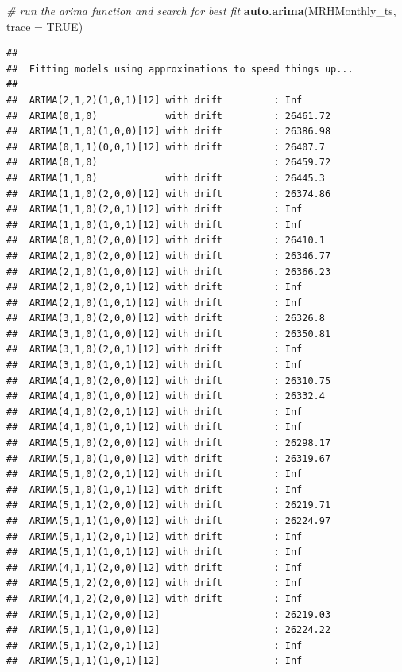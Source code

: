 \documentclass[12pt,]{article}
\newenvironment{Shaded}{\begin{snugshade}}{\end{snugshade}}
\newcommand{\CommentTok}[1]{\textcolor[rgb]{0.56,0.35,0.01}{\textit{#1}}}
\newcommand{\DataTypeTok}[1]{\textcolor[rgb]{0.13,0.29,0.53}{#1}}
\newcommand{\KeywordTok}[1]{\textcolor[rgb]{0.13,0.29,0.53}{\textbf{#1}}}
\newcommand{\NormalTok}[1]{#1}
\newcommand{\OtherTok}[1]{\textcolor[rgb]{0.56,0.35,0.01}{#1}}
\begin{document}
\begin{Shaded}
\begin{Highlighting}[]
\CommentTok{# run the arima function and search for best fit}
\KeywordTok{auto.arima}\NormalTok{(MRHMonthly_ts, }\DataTypeTok{trace =} \OtherTok{TRUE}\NormalTok{)}
\end{Highlighting}
\end{Shaded}

\begin{verbatim}
## 
##  Fitting models using approximations to speed things up...
## 
##  ARIMA(2,1,2)(1,0,1)[12] with drift         : Inf
##  ARIMA(0,1,0)            with drift         : 26461.72
##  ARIMA(1,1,0)(1,0,0)[12] with drift         : 26386.98
##  ARIMA(0,1,1)(0,0,1)[12] with drift         : 26407.7
##  ARIMA(0,1,0)                               : 26459.72
##  ARIMA(1,1,0)            with drift         : 26445.3
##  ARIMA(1,1,0)(2,0,0)[12] with drift         : 26374.86
##  ARIMA(1,1,0)(2,0,1)[12] with drift         : Inf
##  ARIMA(1,1,0)(1,0,1)[12] with drift         : Inf
##  ARIMA(0,1,0)(2,0,0)[12] with drift         : 26410.1
##  ARIMA(2,1,0)(2,0,0)[12] with drift         : 26346.77
##  ARIMA(2,1,0)(1,0,0)[12] with drift         : 26366.23
##  ARIMA(2,1,0)(2,0,1)[12] with drift         : Inf
##  ARIMA(2,1,0)(1,0,1)[12] with drift         : Inf
##  ARIMA(3,1,0)(2,0,0)[12] with drift         : 26326.8
##  ARIMA(3,1,0)(1,0,0)[12] with drift         : 26350.81
##  ARIMA(3,1,0)(2,0,1)[12] with drift         : Inf
##  ARIMA(3,1,0)(1,0,1)[12] with drift         : Inf
##  ARIMA(4,1,0)(2,0,0)[12] with drift         : 26310.75
##  ARIMA(4,1,0)(1,0,0)[12] with drift         : 26332.4
##  ARIMA(4,1,0)(2,0,1)[12] with drift         : Inf
##  ARIMA(4,1,0)(1,0,1)[12] with drift         : Inf
##  ARIMA(5,1,0)(2,0,0)[12] with drift         : 26298.17
##  ARIMA(5,1,0)(1,0,0)[12] with drift         : 26319.67
##  ARIMA(5,1,0)(2,0,1)[12] with drift         : Inf
##  ARIMA(5,1,0)(1,0,1)[12] with drift         : Inf
##  ARIMA(5,1,1)(2,0,0)[12] with drift         : 26219.71
##  ARIMA(5,1,1)(1,0,0)[12] with drift         : 26224.97
##  ARIMA(5,1,1)(2,0,1)[12] with drift         : Inf
##  ARIMA(5,1,1)(1,0,1)[12] with drift         : Inf
##  ARIMA(4,1,1)(2,0,0)[12] with drift         : Inf
##  ARIMA(5,1,2)(2,0,0)[12] with drift         : Inf
##  ARIMA(4,1,2)(2,0,0)[12] with drift         : Inf
##  ARIMA(5,1,1)(2,0,0)[12]                    : 26219.03
##  ARIMA(5,1,1)(1,0,0)[12]                    : 26224.22
##  ARIMA(5,1,1)(2,0,1)[12]                    : Inf
##  ARIMA(5,1,1)(1,0,1)[12]                    : Inf

\end{verbatim}
\end{document}
